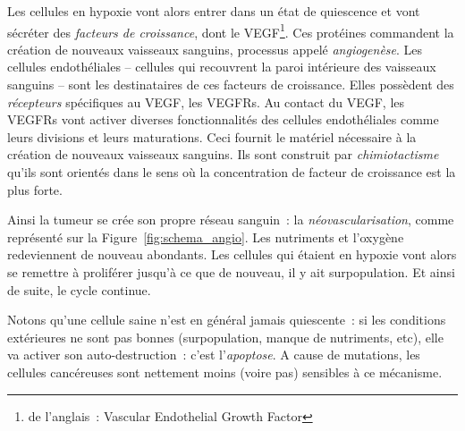 \documentclass[main.tex]{subfiles}
\begin{document}
Les cellules en hypoxie vont alors entrer dans un état de quiescence et vont sécréter des \emph{facteurs de croissance}, dont le VEGF\footnote{de l'anglais~: Vascular Endothelial Growth Factor}. 
Ces protéines commandent la création de nouveaux vaisseaux  
 sanguins, processus appelé \emph{angiogenèse}. 
Les cellules endothéliales -- cellules qui recouvrent la paroi intérieure des vaisseaux sanguins -- sont les destinataires de ces facteurs de croissance. 
Elles possèdent des \emph{récepteurs} spécifiques au VEGF, les VEGFRs. 
Au contact du VEGF, les VEGFRs vont activer diverses fonctionnalités des cellules endothéliales comme leurs divisions et leurs maturations. 
Ceci fournit le matériel nécessaire à la création de nouveaux vaisseaux sanguins. 
Ils sont construit par \emph{chimiotactisme} \cad qu'ils sont 
 orientés dans le sens où la concentration de facteur de croissance est la plus forte. 
 
 Ainsi la tumeur se crée son propre réseau sanguin~: la \emph{néovascularisation}, comme représenté  sur la Figure~\ref{fig:schema_angio}. Les nutriments et l'oxygène redeviennent de nouveau abondants. 
Les cellules qui étaient en hypoxie vont alors se remettre à proliférer jusqu'à ce que de nouveau, il y ait surpopulation. Et ainsi de suite, le cycle continue. 


Notons qu'une cellule saine n'est en général jamais quiescente~: si les conditions extérieures ne sont pas bonnes (surpopulation, manque de nutriments, etc), elle va activer son auto-destruction~: c'est l'\emph{apoptose}. A cause de mutations, les cellules cancéreuses sont nettement moins (voire pas) sensibles à ce mécanisme. 
\end{document}
